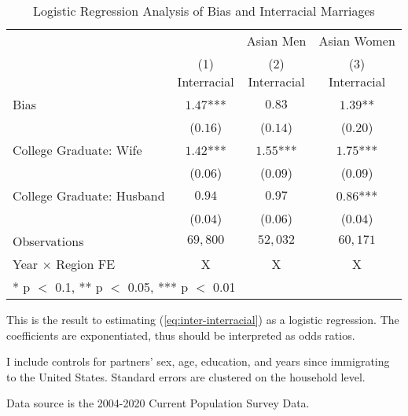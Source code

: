 \begin{table}[H]
\centering\centering
\caption{Logistic Regression Analysis of Bias and Interracial Marriages \label{regtab-logit-03}}
\centering
\begin{threeparttable}
\begin{tabular}[t]{lccc}
\toprule
\multicolumn{2}{c}{ } & \multicolumn{1}{c}{Asian Men} & \multicolumn{1}{c}{Asian Women} \\
\cmidrule(l{3pt}r{3pt}){3-3} \cmidrule(l{3pt}r{3pt}){4-4}
  & \specialcell{(1) \\ Interracial} & \specialcell{(2) \\ Interracial} & \specialcell{(3) \\ Interracial}\\
\midrule
Bias & $1.47$*** & $0.83$ & $1.39$**\\
 & ($0.16$) & ($0.14$) & ($0.20$)\\
College Graduate: Wife & $1.42$*** & $1.55$*** & $1.75$***\\
 & ($0.06$) & ($0.09$) & ($0.09$)\\
College Graduate: Husband & $0.94$ & $0.97$ & $0.86$***\\
 & ($0.04$) & ($0.06$) & ($0.04$)\\
\midrule
Observations & $69,800$ & $52,032$ & $60,171$\\
Year $\times$ Region FE & X & X & X\\
\bottomrule
\multicolumn{4}{l}{\rule{0pt}{1em}* p $<$ 0.1, ** p $<$ 0.05, *** p $<$ 0.01}\\
\end{tabular}
\begin{tablenotes}
\small
\item[1] \footnotesize{This is the result to estimating (\ref{eq:inter-interracial}) as a
                        logistic regression. The coefficients are exponentiated, thus should be interpreted as odds ratios.}
\item[2] \footnotesize{I include controls for partners' sex, age, education, 
                      and years since immigrating to the United States.
                      Standard errors are clustered on the household level.}
\item[3] \footnotesize{Data source is the 2004-2020 Current Population Survey Data.}
\end{tablenotes}
\end{threeparttable}
\end{table}
